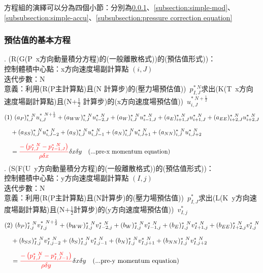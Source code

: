 \documentclass[12pt]{article}
\theoremstyle{upright}
\begin{document}
\noindent 方程組的演繹可以分為四個小節：分別為\ref{subsubsec:pre-law}、\ref{subsection:simple-mod}、\ref{subsubsection:simple-accu}、\ref{subsubsection:pressure correction equation}

\subsubsection {預估值的基本方程}
\label{subsubsec:pre-law}
. \quad  (R(G(P\ x方向動量積分方程)的(一般離散格式))的(預估值形式))：\\[0.5ex]
\noindent \quad 控制體積中心點：x方向速度場副計算點 $(i,J)$ \\
\noindent \quad 迭代步數：N\\
\noindent \quad 意義：利用(R(P主計算點)且(N 計算步)的(壓力場預估值))\ $p_{I,J}^{*\ N}$求出(K(T\ x方向速度場副計算點)且(N+$\frac{1}{2}$ 計算步)的(x方向速度場預估值))\ $u_{i,J}^{*\ N+\frac{1}{2}}$
\begin{equation}\label{eq:pre1}\begin{split}
    &(1)\  (a_{P})_{i,J}^{*\ N}u_{i,J}^{*\ N+\frac{1}{2}} + (a_{WW})_{i,J}^{*\ N}u_{i-2,J}^{*\ N} + (a_{W})_{i,J}^{*\ N}u_{i-1,J}^{*\ N} + (a_{E})_{i+1,J}^{*\ N}u_{i+1,J}^{*\ N} + (a_{EE})_{i+2,J}^{*\ N}u_{i+2,J}^{*\ N} \\[1.5ex]
    &\quad +(a_{SS})_{i,J}^{*\ N}u_{i,J-2}^{*\ N} + (a_{S})_{i,J}^{*\ N}u_{i,J-1}^{*\ N} + (a_{N})_{i,J}^{*\ N}u_{i,J+1}^{*\ N} + (a_{NN})_{i,J}^{*\ N}u_{i,J+2}^{*\ N} \\[1.5ex]
    &\quad = {\color{red}\frac{-\left(p_{I,J}^{*\ N} - p_{I-1,J}^{*\ N}\right)}{\rho\delta x}}\delta x \delta y \quad \text{(...pre-x momentum equation)}
\end{split}\end{equation}
. \quad  (S(F(U\ y方向動量積分方程)的(一般離散格式))的(預估值形式))：\\
\noindent \quad 控制體積中心點：y方向速度場副計算點 $(I,j)$ \\
\noindent \quad 迭代步數：N\\
\noindent \quad 意義：利用(R(P主計算點)且(N計算步)的(壓力場預估值))\ $p_{I,J}^{*}$求出(L(K\ y方向速度場副計算點)且(N+$\frac{1}{2}$計算步)的(y方向速度場預估值))\ $v_{I,j}^{*}$
\begin{equation}\label{eq:pre2}\begin{split}
    &(2)\  (b_{P})_{I,j}^{*\ N}v_{I,j}^{*\ N+\frac{1}{2}} + (b_{WW})_{I,j}^{*\ N}v_{I-2,j}^{*\ N} + (b_{W})_{I,j}^{*\ N}v_{I-1,j}^{*\ N} + (b_{E})_{I,j}^{*\ N}v_{I+1,j}^{*\ N} + (b_{EE})_{I+2,j}^{*\ N}v_{I,j}^{*\ N} \\[1.5ex]
    &\quad +(b_{SS})_{I,j}^{*\ N}v_{I,j-2}^{*\ N} + (b_{S})_{I,j}^{*\ N}v_{I,j-1}^{*\ N} + (b_{N})_{I,j}^{*\ N}v_{I,j+1}^{*\ N} + (b_{NN})_{I,j}^{*\ N}v_{I,j+2}^{*\ N} \\[1.5ex]
    &\quad = {\color{red}\frac{-\left(p_{I,J}^{*\ N} - p_{I,J-1}^{*\ N}\right)}{\rho\delta y}}\delta x \delta y \quad \text{(...pre-y momentum equation)}
\end{split}\end{equation}
\end{document}
